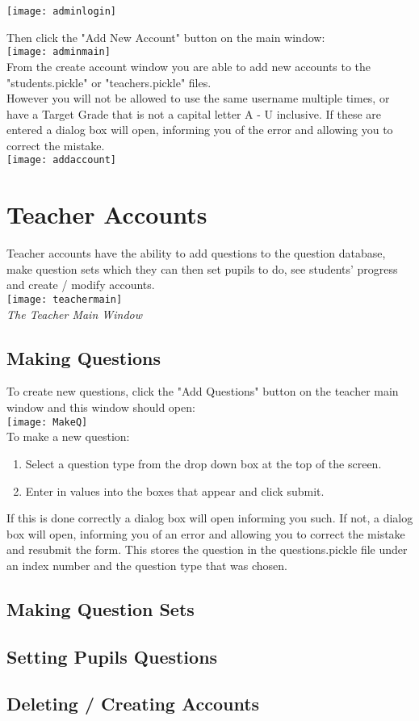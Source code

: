 \documentclass{report}
\begin{document}
\bigskip

\texttt{[image: adminlogin]}\\
\bigskip

\bigskip
Then click the "Add New Account" button on the main window:\\
\bigskip
\texttt{[image: adminmain]}\\
\clearpage
From the create account window you are able to add new accounts to the "students.pickle" or "teachers.pickle" files.\\
However you will not be allowed to use the same username multiple times, or have a Target Grade that is not a capital letter A - U inclusive. If these are entered a dialog box will open, informing you of the error and allowing you to correct the mistake.\\
\texttt{[image: addaccount]}\\

\chapter{Teacher Accounts}
Teacher accounts have the ability to add questions to the question database, make question sets which they can then set pupils to do, see students' progress and create / modify accounts. \\
\texttt{[image: teachermain]}\\
\emph{The Teacher Main Window}
\section{Making Questions}
To create new questions, click the "Add Questions" button on the teacher main window and this window should open:\\
\texttt{[image: MakeQ]}\\
To make a new question:\\
\begin{enumerate}
\item{Select a question type from the drop down box at the top of the screen.}
 \item{Enter in values into the boxes that appear and click submit.}
\end{enumerate}
If this is done correctly a dialog box will open informing you such. If not, a dialog box will open, informing you of an error and allowing you to correct the mistake and resubmit the form.
This stores the question in the questions.pickle file under an index number and the question type that was chosen.
\section{Making Question Sets}
\section{Setting Pupils Questions}
\section{Deleting  / Creating Accounts}
\end{document}
